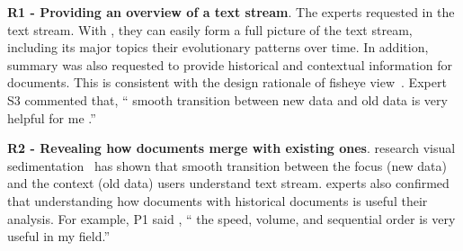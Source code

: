 \noindent \textbf{\normalsize R1 - Providing an overview of a text stream}.
The experts requested  in the text stream.
With , they can easily form a full picture of the text stream, including its major topics  their evolutionary patterns over time.
In addition,  summary was also requested to provide historical and contextual information for  documents.
This is consistent with the design rationale of fisheye view~\cite{Furnas1986}.
Expert S3 commented that, `` smooth transition between new data and old data is very helpful for me .''

\noindent \textbf{\normalsize R2 - Revealing how  documents merge with existing ones}.
 research  visual sedimentation~\cite{Huron2013visual} has shown that  smooth transition between the focus (new data) and the context (old data)  users understand  text stream.
 experts also confirmed that understanding how  documents  with historical documents is useful  their analysis.
For example, P1 said , `` the speed, volume, and sequential order  is very useful   in my field.''

